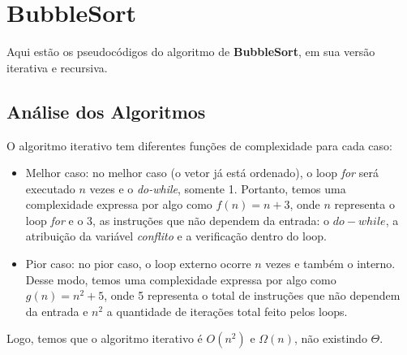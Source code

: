 \section{BubbleSort}
Aqui estão os pseudocódigos do algoritmo de \textbf{BubbleSort}, em sua versão iterativa e recursiva.
 

\subsection{Análise dos Algoritmos}
O algoritmo iterativo tem diferentes funções de complexidade para cada caso:
\begin{itemize}
  \item Melhor caso: no melhor caso (o vetor já está ordenado), o loop \textit{for} será executado $n$ vezes e o \textit{do-while}, somente 1. Portanto, temos uma complexidade expressa por algo como $f(n) = n + 3$, onde $n$ representa o loop \textit{for} e o 3, as instruções que não dependem da entrada: o $do-while$, a atribuição da variável \textit{conflito} e a verificação dentro do loop.
  \item Pior caso: no pior caso, o loop externo ocorre $n$ vezes e também o interno. Desse modo, temos uma complexidade expressa por algo como $g(n) = n^2 + 5$, onde 5 representa o total de instruções que não dependem da entrada e $n^2$ a quantidade de iterações total feito pelos loops.
\end{itemize}

Logo, temos que o algoritmo iterativo é $O(n^2)$ e $\Omega(n)$, não existindo $\Theta$.
